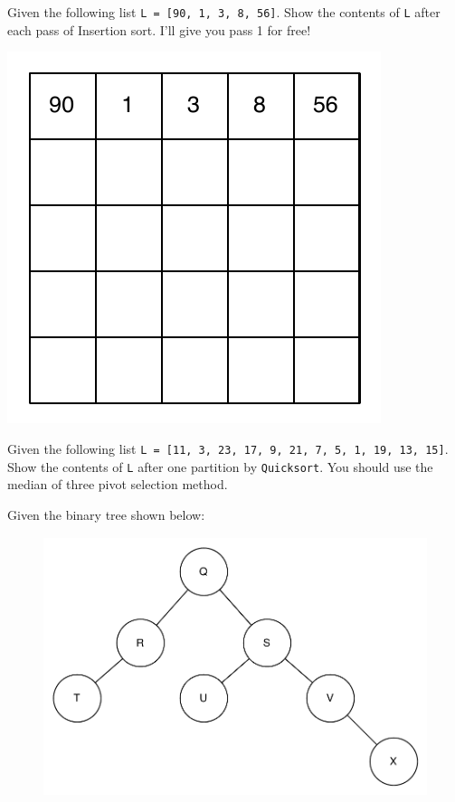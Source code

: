 \documentclass[11pt]{exam}
\begin{document}
\begin{questions}
\question[10] Given the following list \lstinline{L = [90, 1, 3, 8, 56]}.  Show the contents of \lstinline{L} after each pass of Insertion sort.  I'll give you pass 1 for free!
\begin{center}
\includegraphics{insertion_boxes}
\end{center}

\question[10] Given the following list
\lstinline{L = [11, 3, 23, 17, 9, 21, 7, 5, 1, 19, 13, 15]}.  Show the contents of \lstinline{L} after one partition by \texttt{Quicksort}.  You should use the median of three pivot selection method.
\vspace{4.5in}

%

\newpage
\question Given the binary tree shown below:
\begin{figure}[h!]
    \begin{center}
        \includegraphics[height=3in]{binaryTree}
    \end{center}
\end{figure}
\begin{parts}

\end{parts}
\end{questions}
\end{document}
